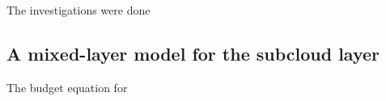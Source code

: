 \documentclass[12pt]{article}
\begin{document}
\begin{acknowledgment}
The investigations were done  
\end{acknowledgment}


 \renewcommand{\theequation}{A-\arabic{equation}}
  \setcounter{equation}{0}  %
\begin{appendices}

\section{A mixed-layer model for the subcloud layer}

The budget equation for 
\end{appendices}

{}
{\clearpage}


\end{document}
